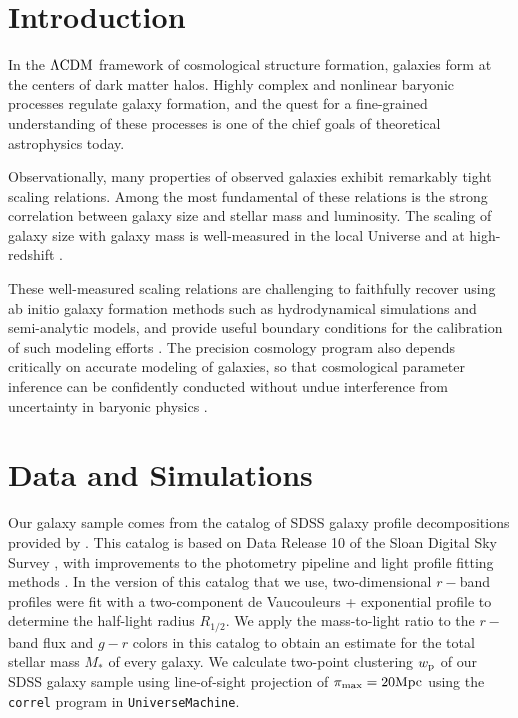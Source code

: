 \documentclass[usenatbib,usegraphicx,letterpaper]{mn2e}
\newcommand{\rhalf}{R_{1/2}}
\newcommand{\mstar}{M_{\ast}}
\newcommand{\lcdm}{\Lambda{\rm CDM}}
\newcommand{\wproj}{w_{\rm p}}
\newcommand{\mpc}{{\rm Mpc}}
\begin{document}
\section{Introduction}
\label{sec:intro}

In the $\lcdm$ framework of cosmological structure formation, galaxies form at the centers of dark matter halos. Highly complex and nonlinear baryonic processes regulate galaxy formation, and the quest for a fine-grained understanding of these processes is one of the chief goals of theoretical astrophysics today. 

Observationally, many properties of observed galaxies exhibit remarkably tight scaling relations. Among the most fundamental of these relations is the strong correlation between galaxy size and stellar mass and luminosity. The scaling of galaxy size with galaxy mass is well-measured in the local Universe \citep{shen_etal03,guo_etal09,huang_etal13,zhang_yang17} and at high-redshift \citep{trujillo_etal04,vanderwel_etal14,kawamata_etal15,shibuya_etal15,huertas_company_etal13a,lange_etal15,huang_etal17}.

These well-measured scaling relations are challenging to faithfully recover using ab initio galaxy formation methods such as hydrodynamical simulations and semi-analytic models, and provide useful boundary conditions for the calibration of such modeling efforts \citep{khochfar_silk06,dutton_etal10,hopkins_etal10a,bottrell_etal17b}. The precision cosmology program also depends critically on accurate modeling of galaxies, so that cosmological parameter inference can be confidently conducted without undue interference from uncertainty in baryonic physics \citep{LSST_science,LSST_galaxies}. 

\section{Data and Simulations}
\label{sec:data}

Our galaxy sample comes from the catalog of SDSS galaxy profile decompositions provided by \citet{meert_etal15}. This catalog is based on Data Release 10 of the Sloan Digital Sky Survey \citep[SDSS,][]{ahn_etal14}, with improvements to the photometry pipeline and light profile fitting methods \citep{vikram_etal10,bernardi_etal13,bernardi_etal14,meert_etal13}. In the version of this catalog that we use, two-dimensional $r-$band profiles were fit with a two-component de Vaucouleurs + exponential profile to determine the half-light radius $\rhalf.$ We apply the \citet{bell_etal03} mass-to-light ratio to the $r-$band flux and $g-r$ colors in this catalog to obtain an estimate for the total stellar mass $\mstar$ of every galaxy. We calculate two-point clustering $\wproj$ of our SDSS galaxy sample using line-of-sight projection of $\pi_{\rm max}=20\mpc$ using the {\tt correl} program in {\tt UniverseMachine}.
\end{document}
